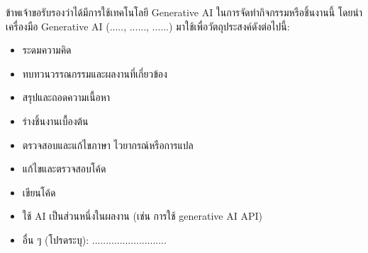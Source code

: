 \begin{aiack}
    ข้าพเจ้าขอรับรองว่าได้มีการใช้เทคโนโลยี Generative AI ในการจัดทํากิจกรรมหรือชิ้นงานนี้ โดยนําเครื่องมือ Generative AI (....., ......, ......) มาใช้เพื่อวัตถุประสงค์ดังต่อไปนี้:
    \begin{itemize}

        \item[$\square$] ระดมความคิด
        \item[$\square$] ทบทวนวรรณกรรมและผลงานที่เกี่ยวข้อง
        \item[$\square$] สรุปและถอดความเนื้อหา
        \item[$\square$] ร่างชิ้นงานเบื้องต้น
        \item[\rlap{\raisebox{0.3ex}{\hspace{0.4ex}\tiny \ding{52}}}$\square$] ตรวจสอบและแก้ไขภาษา ไวยากรณ์หรือการแปล
        \item[$\square$] แก้ไขและตรวจสอบโค้ด
        \item[\rlap{\raisebox{0.3ex}{\hspace{0.4ex}\tiny \ding{52}}}$\square$] เขียนโค้ด
        \item[$\square$] ใช้ AI เป็นส่วนหนึ่งในผลงาน (เช่น การใช้ generative AI API)
        \item[$\square$] อื่น ๆ (โปรดระบุ): ...........................
    \end{itemize}

\end{aiack}